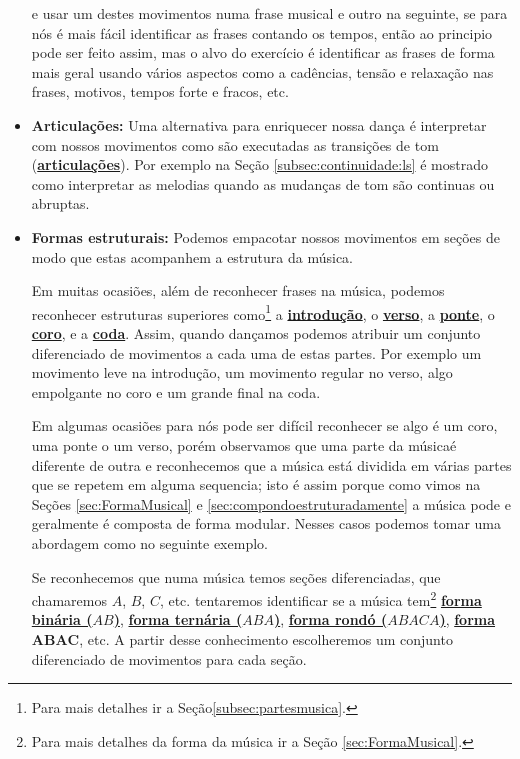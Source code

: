 \begin{itemize}
\begin{example}
e usar um destes movimentos numa frase musical e outro na seguinte, 
se para nós é mais fácil identificar as frases contando 
os tempos, então ao principio pode ser feito assim, mas o alvo do exercício é identificar as frases 
de forma mais geral usando vários aspectos como a cadências, 
tensão e relaxação nas frases, motivos, tempos forte e fracos, etc. 
\end{example} 
\item \textbf{Articulações:} Uma alternativa para enriquecer nossa dança é
interpretar com nossos movimentos como são executadas as transições de tom 
(\hyperref[sub:Articulation]{\textbf{articulações}}).
Por exemplo na Seção \ref{subsec:continuidade:ls} é mostrado como interpretar
as melodias quando as mudanças de tom são continuas ou abruptas. 
\item \textbf{Formas estruturais:}
Podemos empacotar nossos movimentos em seções de modo que estas
acompanhem a estrutura da música.
\begin{example}
Em muitas ocasiões, além de reconhecer frases na música,
podemos reconhecer estruturas superiores como\footnote{Para mais detalhes ir a Seção\ref{subsec:partesmusica}.}
a \hyperref[ref:Introducao]{\textbf{introdução}},
o \hyperref[ref:Verse]{\textbf{verso}},
a \hyperref[ref:Ponte]{\textbf{ponte}},
o \hyperref[ref:Coro]{\textbf{coro}}, e
a \hyperref[ref:Coda]{\textbf{coda}}.
Assim, quando dançamos podemos atribuir um conjunto diferenciado de movimentos
a cada uma de estas partes. 
Por exemplo um movimento leve na introdução, um movimento regular no verso, 
algo empolgante no coro e um grande final na coda.
\end{example}
Em algumas ocasiões para nós pode ser difícil reconhecer se algo é um coro, uma ponte o um verso,
porém observamos que uma parte da músicaé diferente de outra e reconhecemos que a música 
está dividida em várias partes que se repetem em alguma sequencia;
isto é assim porque como vimos na Seções \ref{sec:FormaMusical} e \ref{sec:compondoestruturadamente}
a música pode e geralmente é composta de forma modular.
Nesses casos podemos tomar uma abordagem como no seguinte exemplo.
\begin{example}
Se reconhecemos que numa música temos seções diferenciadas, que chamaremos $A$, $B$, $C$, etc.
tentaremos identificar se a música tem\footnote{Para mais detalhes da forma da música ir a Seção \ref{sec:FormaMusical}.}
\hyperref[subsec:formabinaria]{\textbf{forma binária ($AB$)}}, 
\hyperref[subsec:formaternaria]{\textbf{forma ternária ($ABA$)}}, 
\hyperref[subsec:formarondo]{\textbf{forma rondó ($ABACA$)}},  
\hyperref[subsec:formaabac]{\textbf{forma $\mathbf{ABAC}$}}, 
etc.
A partir desse conhecimento escolheremos um conjunto diferenciado de movimentos para cada seção. 
\end{example}
\end{itemize}



